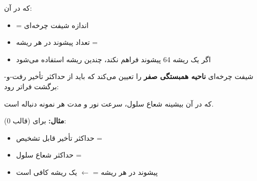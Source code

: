 که در آن:

\begin{itemize}
\tightlist
\item
   = اندازه شیفت چرخه‌ای 
\item
  تعداد پیشوند در هر ریشه = 
\item
  اگر یک ریشه 64 پیشوند فراهم نکند، چندین ریشه استفاده می‌شود
\end{itemize}


شیفت چرخه‌ای  \textbf{ناحیه همبستگی صفر} را تعیین می‌کند که باید از حداکثر تأخیر رفت-و-برگشت فراتر رود:


که در آن  بیشینه شعاع سلول،  سرعت نور  و  مدت هر نمونه دنباله است.

\textbf{مثال:} برای  (قالب 0):

\begin{itemize}
\tightlist
\item
  حداکثر تأخیر قابل تشخیص = 
\item
  حداکثر شعاع سلول = 
\item
  پیشوند در هر ریشه =  \ensuremath{\leftarrow} یک ریشه کافی است
\end{itemize}




\CNchained{}




\CNchained{}

